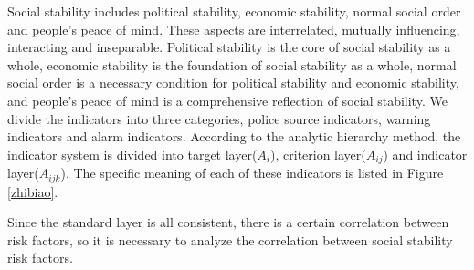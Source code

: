 \documentclass[12pt]{article}  %
\begin{document}
Social stability includes political stability, economic stability, normal social order and people's peace of mind. These aspects are interrelated, mutually influencing, interacting and inseparable. Political stability is the core of social stability as a whole, economic stability is the foundation of social stability as a whole, normal social order is a necessary condition for political stability and economic stability, and people's peace of mind is a comprehensive reflection of social stability. We divide the indicators into three categories, police source indicators, warning indicators and alarm indicators. According to the analytic hierarchy method, the indicator system is divided into target layer($A_i$), criterion layer($A_{ij}$) and indicator layer($A_{ijk}$). The specific meaning of each of these indicators is listed in Figure \ref{zhibiao}.

Since the standard layer is all consistent, there is a certain correlation between risk factors, so it is necessary to analyze the correlation between social stability risk factors.
\end{document}
